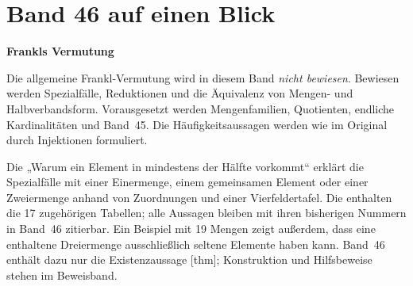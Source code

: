 \chapter[Band 46: Frankls Vermutung]{Band 46 auf einen Blick}
\noindent\textbf{Frankls Vermutung}\par\medskip
Die allgemeine Frankl-Vermutung wird in diesem Band
\emph{nicht bewiesen}. Bewiesen werden Spezialfälle, Reduktionen und die
Äquivalenz von Mengen- und Halbverbandsform. Vorausgesetzt werden
Mengenfamilien, Quotienten, endliche Kardinalitäten und Band~45.
Die Häufigkeitsaussagen werden wie im Original durch Injektionen formuliert.

Die \FranklReadingLink{} „Warum ein Element in mindestens der Hälfte vorkommt“
erklärt die Spezialfälle mit einer Einermenge, einem gemeinsamen Element
oder einer Zweiermenge anhand von Zuordnungen und einer Vierfeldertafel.
Die \FranklProofsLink{} enthalten die 17 zugehörigen Tabellen;
alle Aussagen bleiben mit ihren bisherigen Nummern in Band~46 zitierbar.
Ein Beispiel mit 19 Mengen zeigt außerdem, dass eine enthaltene Dreiermenge
ausschließlich seltene Elemente haben kann. Band~46 enthält dazu nur die
Existenzaussage [thm]; Konstruktion und Hilfsbeweise
stehen im Beweisband.

